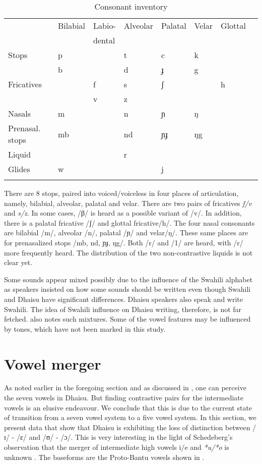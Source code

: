 \documentclass[output=paper,colorlinks,citecolor=brown]{langscibook}
\begin{document}
\begin{table}
	\caption {Consonant inventory \citep[5]{RugemaliraEtAl2019} }
 	\label{tab:ngonyani:2}
    \begin{tabular}{llllllll}
    \lsptoprule 
        & Bilabial & Labio-  & Alveolar & Palatal & Velar & Glottal\\
        & & dental\\
    \midrule
        Stops & p & & t & c & k\\
        & b &  &   d & ɟ & g\\
        Fricatives & & f &   s & ʃ & & h\\
        & & v &   z\\
        Nasals & m & &    n & ɲ & ŋ\\
        Prenasal. stops & mb & &  nd & ɲɟ & ŋg \\
        Liquid & & &    r\\
        Glides & w & &    & j\\
    \lspbottomrule
    \end{tabular}
\end{table}

There are 8 stops, paired into voiced/voiceless in four places of articulation, namely, bilabial, alveolar, palatal and velar. There are two pairs of fricatives \textit{f/v} and \textit{s/z}. In some cases, /β/ is heard as a possible variant of /v/. In addition, there is a palatal fricative /ʃ/ and glottal fricative/h/. The four nasal consonants are bilabial /m/, alveolar /n/, palatal /ɲ/ and velar/ŋ/. These same places are for prenasalized stops /mb, nd, ɲɟ, ŋg/. Both /r/ and /1/ are heard, with /r/ more frequently heard. The distribution of the two non-contrastive liquids is not clear yet.
 
Some sounds appear mixed possibly due to the influence of the Swahili alphabet as speakers insisted on how some sounds should be written even though Swahili and Dhaisu have significant differences. Dhaisu speakers also speak and write Swahili. The idea of Swahili influence on Dhaisu writing, therefore, is not far fetched. \cite{Nurse2000} also notes such mixtures. Some of the vowel features may be influenced by tones, which have not been marked in this study.


\section{Vowel merger}\label{sec:ngonyani:3}

As noted earlier in the foregoing section and as discussed in \cite{Nurse2000}, one can perceive the seven vowels in Dhaisu. But finding contrastive pairs for the intermediate vowels is an elusive endeavour. We conclude that this is due to the current state of transition from a seven vowel system to a five vowel system. In this section, we present data that show that Dhaisu is exhibiting the loss of distinction between /ɪ/ - /ɛ/ and /ʊ/ - /ɔ/. This is very interesting in the light of Schedeberg's observation that the merger of intermediate high vowels i/e and \textit{*u/*o} is unknown \citep[74]{Schadeberg1995}. The baseforms are the Proto-Bantu vowels  shown in .
\end{document}
